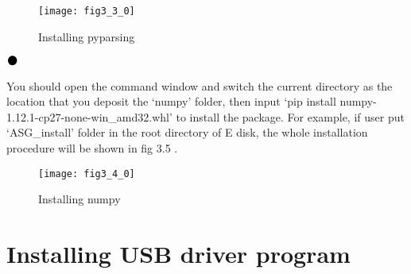 
\begin{figure}[H]
\centering
\texttt{[image: fig3\_3\_0]}
\caption{\hspace{0.2cm}Installing pyparsing}
\end{figure}

\noindent$\vcenter{\hbox{\huge$\bullet$}}$\quad\fontsize{12pt}{\baselineskip}\textbf{}

\hspace{-0.2cm} You should open the command window and switch the current directory as the location that you deposit the `numpy' folder, then input `pip install numpy-1.12.1-cp27-none-win\_amd32.whl' to install the package. For example, if user put `ASG\_install' folder in the root directory of E disk, the whole installation procedure will be shown in fig 3.5 .
\begin{figure}[H]
\centering
\texttt{[image: fig3\_4\_0]}
\caption{\hspace{0.2cm}Installing numpy}
\end{figure}

\vspace{0.8cm}
\section{\heiti Installing USB driver program}

